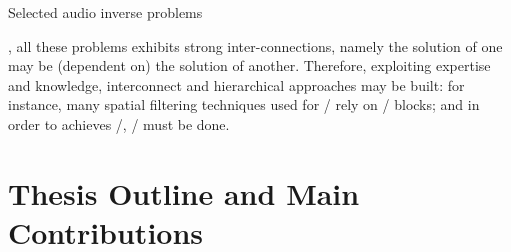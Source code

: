 
\begin{table}[!h]

    \begin{fullwidth}
    \centering
    \small

    
    \caption{Selected audio inverse problems}
    \label{tab:processing:problems}

    \end{fullwidth}


\end{table}

, all these problems exhibits strong inter-connections,
namely the solution of one may be (dependent on) the solution of another.
Therefore, exploiting expertise and knowledge,
interconnect and hierarchical approaches may be built:
for instance, many spatial filtering techniques used for \SE/ rely on \SSL/ blocks;
and in order to achieves \RooGE/, \AER/ must be done.



\section{Thesis Outline and Main Contributions}

